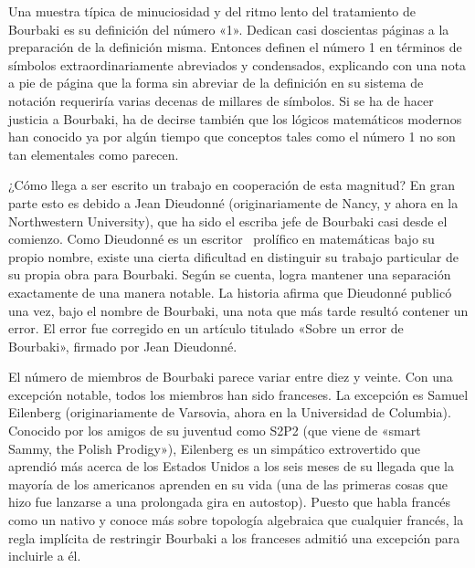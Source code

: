 \documentclass[a4paper, 12pt]{article}
\begin{document}
 Una muestra típica de minuciosidad y del ritmo lento del 
tratamiento de Bourbaki es su definición del número «1». Dedican 
casi doscientas páginas a la preparación de la definición misma. 
Entonces definen el número 1 en términos de símbolos 
extraordinariamente abreviados y condensados, explicando con una nota a pie 
de página que la forma sin abreviar de la definición en su sistema 
de notación requeriría varias decenas de millares de símbolos. 
Si se ha de hacer justicia a Bourbaki, ha de decirse también que los 
lógicos matemáticos modernos han conocido ya por algún tiempo 
que conceptos tales como el número 1 no son tan elementales como 
parecen. 

¿Cómo llega a ser escrito un trabajo en cooperación de esta 
magnitud? En gran parte esto es debido a Jean Dieudonné (originariamente 
de Nancy, y ahora en la Northwestern University), que ha sido el escriba 
jefe de Bourbaki casi desde el comienzo. Como Dieudonné es un escritor~ 
prolífico en matemáticas bajo su propio nombre, existe una cierta 
dificultad en distinguir su trabajo particular de su propia obra para 
Bourbaki. Según se cuenta, logra mantener una separación exactamente 
de una manera notable. La historia afirma que Dieudonné publicó una 
vez, bajo el nombre de Bourbaki, una nota que más tarde resultó 
contener un error. El error fue corregido en un artículo titulado 
«Sobre un error de Bourbaki», firmado por Jean Dieudonné. 

El número de miembros de Bourbaki parece variar entre diez y 
veinte. Con una excepción notable, todos los miembros han sido 
franceses. La excepción es Samuel Eilenberg (originariamente de 
Varsovia, ahora en la Universidad de Columbia). Conocido por los amigos de 
su juventud como S2P2 (que viene de «smart Sammy, the Polish Prodigy»), 
Eilenberg es un simpático extrovertido que aprendió más acerca 
de los Estados Unidos a los seis meses de su llegada que la mayoría de 
los americanos aprenden en su vida (una de las primeras cosas que hizo fue 
lanzarse a una prolongada gira en autostop). Puesto que habla francés 
como un nativo y conoce más sobre topología algebraica que 
cualquier francés, la regla implícita de restringir Bourbaki a los 
franceses admitió una excepción para incluirle a él. 
\end{document}
